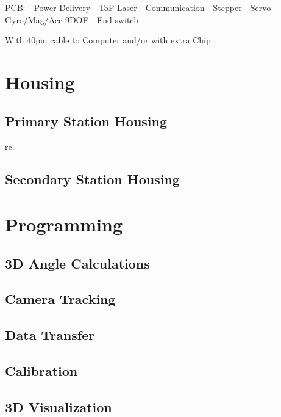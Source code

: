 PCB:
- Power Delivery
- ToF Laser
- Communication
- Stepper
- Servo
- Gyro/Mag/Acc 9DOF
- End switch

With 40pin cable to Computer and/or with extra Chip

\section{Housing}

\subsection{Primary Station Housing}re.

\subsection{Secondary Station Housing}

\section{Programming}

\subsection{3D Angle Calculations}

\subsection{Camera Tracking}

\subsection{Data Transfer}

\subsection{Calibration}

\subsection{3D Visualization}
